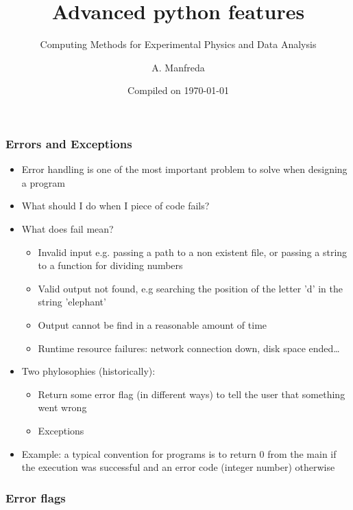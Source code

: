 \documentclass[9pt]{beamer}
\title{Advanced python features}
\subtitle{Computing Methods for Experimental Physics and Data Analysis}
\date{Compiled on \today}
\author{A. Manfreda}
\institute[INFN]{INFN--Pisa}
\begin{document}
\titleframe


\begin{frame}
  \frametitle{Errors and Exceptions}
  
  \begin{itemize}
    \item \alert{Error handling} is one of the most important problem to solve when designing a program
    \item What should I do when I piece of code fails?
    \item What does fail mean?
    \begin {itemize}
      \item Invalid input e.g. passing a path to a non existent file, or passing a string to a function for dividing numbers
      \item Valid output not found, e.g searching the position of the letter 'd' in the string 'elephant'
      \item Output cannot be find in a reasonable amount of time
      \item Runtime resource failures: network connection down, disk space ended\dots
    \end{itemize}
    \item Two phylosophies (historically):
    \begin{itemize}
      \item Return some \alert{error flag} (in different ways) to tell the user that something went wrong
      \item \alert{Exceptions}
    \end{itemize}
    \item Example: a typical convention for programs is to return 0 from the main if the execution was successful and an
          error code (integer number) otherwise
  \end{itemize}
  
\end{frame}


\begin{frame}
  \frametitle{Error flags}
  
\end{frame}
\end{document}
